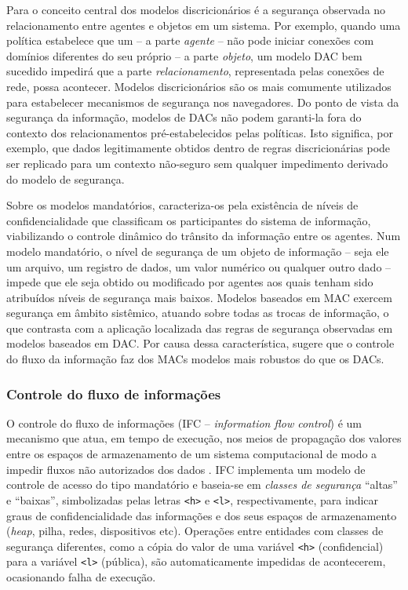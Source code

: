 Para \citeauthor{Foster1998} o conceito central dos modelos discricionários é a segurança observada no relacionamento entre agentes e objetos em um sistema. Por exemplo, quando uma política estabelece que um {\script} -- a parte \textit{agente} -- não pode iniciar conexões com domínios diferentes do seu próprio -- a parte \textit{objeto}, um modelo DAC bem sucedido impedirá que a parte \textit{relacionamento}, representada pelas conexões de rede, possa acontecer. Modelos discricionários são os mais comumente utilizados para estabelecer mecanismos de segurança nos navegadores. Do ponto de vista da segurança da informação, modelos de DACs não podem garanti-la  fora do contexto dos relacionamentos pré-estabelecidos pelas políticas. Isto significa, por exemplo, que dados legitimamente obtidos dentro de regras discricionárias pode ser replicado para um contexto não-seguro sem qualquer impedimento derivado do modelo de segurança.

Sobre os modelos mandatórios, \citeauthor{Foster1998} caracteriza-os pela existência de níveis de confidencialidade que classificam os participantes do sistema de informação, viabilizando o controle dinâmico do trânsito da informação entre os agentes. Num modelo mandatório, o nível de segurança de um objeto de informação -- seja ele um arquivo, um registro de dados, um valor numérico ou qualquer outro dado -- impede que ele seja obtido ou modificado por agentes aos quais tenham sido atribuídos níveis de segurança mais baixos. Modelos baseados em MAC exercem segurança em âmbito sistêmico, atuando sobre todas as trocas de informação, o que contrasta com a aplicação localizada das regras de segurança observadas em modelos baseados em DAC. Por causa dessa característica, \citeauthor{Foster1998} sugere que o controle do fluxo da informação faz dos MACs modelos mais robustos do que os DACs.

\subsubsection{Controle do fluxo de informações}
O controle do fluxo de informações (IFC -- \textit{information flow control}) é um mecanismo que atua, em tempo de execução, nos meios de propagação dos valores entre os espaços de armazenamento de um sistema computacional de modo a impedir fluxos não autorizados dos dados \cite{Denning1976}. IFC implementa um modelo de controle de acesso do tipo mandatório e baseia-se em \textit{classes de segurança} ``altas'' e ``baixas'', simbolizadas pelas letras \texttt{<h>} e \texttt{<l>}, respectivamente, para indicar graus de confidencialidade das informações e dos seus espaços de armazenamento (\textit{heap}, pilha, redes, dispositivos etc). Operações entre entidades com classes de segurança diferentes, como a cópia do valor de uma variável \texttt{<h>} (confidencial) para a variável \texttt{<l>} (pública), são automaticamente impedidas de acontecerem, ocasionando falha de execução.

